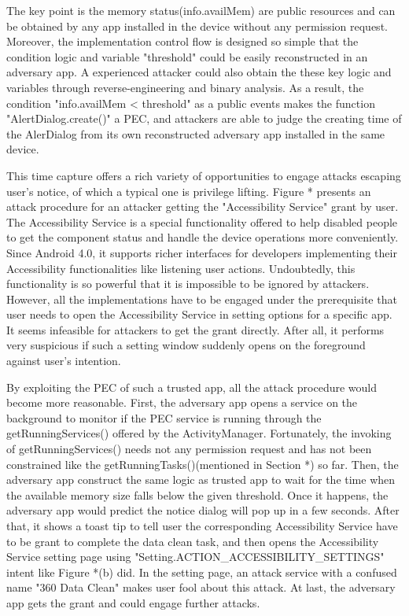 \documentclass{sig-alternate-05-2015}
\begin{document}
The key point is the memory status(info.availMem) are public resources and can be obtained by any app installed in the device without any permission request. Moreover, the implementation control flow is designed so simple that 
the condition logic and variable "threshold" could be easily reconstructed in an adversary app. A experienced attacker could also obtain the these key logic and variables through reverse-engineering and binary analysis. As a result, the condition "info.availMem < threshold" as a public events makes the function "AlertDialog.create()" a PEC, and attackers are able to judge the creating time of the AlerDialog from its own reconstructed adversary app installed in the same device.

This time capture offers a rich variety of opportunities to engage attacks escaping user's notice, of which a typical one is privilege lifting. Figure * presents an attack procedure for an attacker getting the "Accessibility Service" grant by user. The Accessibility Service is a special functionality offered to help disabled people to get the component status and handle the device operations more conveniently. Since Android 4.0, it supports richer interfaces for developers implementing their Accessibility functionalities like listening user actions. Undoubtedly, this functionality is so powerful that it is impossible to be ignored by attackers. However, all the implementations have to be engaged under the prerequisite that user needs to open the Accessibility Service in setting options for a specific app. It seems infeasible for attackers to get the grant directly. After all, it performs very suspicious if such a setting window suddenly opens on the foreground against user's intention.

By exploiting the PEC of such a trusted app, all the attack procedure would become more reasonable. First, the adversary app opens a service on the background to monitor if the PEC service is running through the getRunningServices() offered by the ActivityManager. Fortunately, the invoking of getRunningServices() needs not any permission request and has not been constrained like the getRunningTasks()(mentioned in Section *) so far. Then, the adversary app construct the same logic as trusted app to wait for the time when the available memory size falls below the given threshold. Once it happens, the adversary app would predict the notice dialog will pop up in a few seconds. After that, it shows a toast tip to tell user the corresponding Accessibility Service have to be grant to complete the data clean task, and then opens the Accessibility Service setting page using "Setting.ACTION\_ACCESSIBILITY\_SETTINGS" intent like Figure *(b) did. In the setting page, an attack service with a confused name "360 Data Clean" makes user fool about this attack. At last, the adversary app gets the grant and could engage further attacks. 
\end{document}
